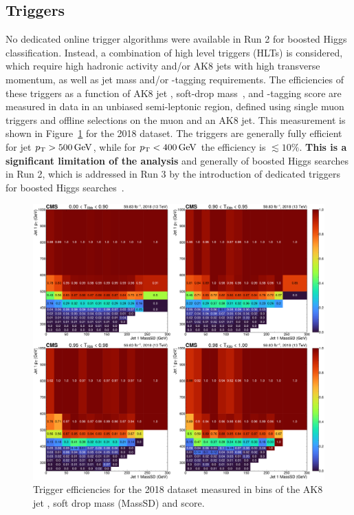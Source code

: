 \subsection{Triggers}
\label{sec:05_triggers}

No dedicated online trigger algorithms were available in Run 2 for boosted Higgs classification.
Instead, a combination of high level triggers (HLTs) is considered, which require high hadronic activity and/or AK8 jets with high transverse momentum, as well as jet mass and/or \Pb-tagging requirements.
The efficiencies of these triggers as a function of AK8 jet \pt, soft-drop mass~\cite{Larkoski:2014wba}, and \bbbar-tagging score are measured in data in an unbiased semi-leptonic \ttbar region, defined using single muon triggers and offline selections on the muon and an AK8 jet.
This measurement is shown in Figure~\ref{fig:05_triggers_eff_2018} for the 2018 dataset.
The triggers are generally fully efficient for jet $p_\mathrm{T} > 500\,\text{Ge\hspace{-.08em}V}$, while for $p_\mathrm{T} < 400\,\text{Ge\hspace{-.08em}V}$ the efficiency is $\lesssim 10\%$.
\textbf{This is a significant limitation of the analysis} and generally of boosted Higgs searches in Run 2, which is addressed in Run 3 by the introduction of dedicated triggers for boosted Higgs searches~\cite{Varghese:2023bue}.

\begin{figure}[hbt!]
\centering
\includegraphics[width=\textwidth]{figures/05-HH/selection/2018_txbb_effs.pdf}
\caption{Trigger efficiencies for the 2018 dataset measured in bins of the AK8 jet \pt, soft drop mass (MassSD) and \TXbb score.
\label{fig:05_triggers_eff_2018}
}
\end{figure}

